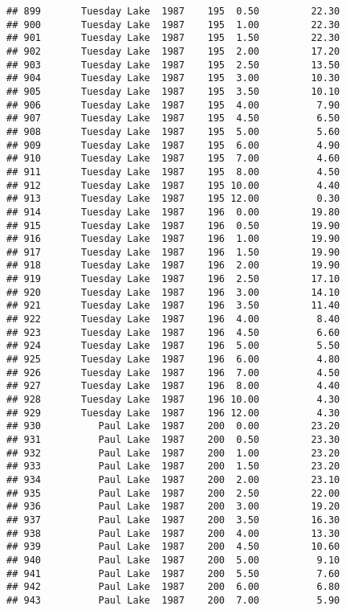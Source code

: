 \documentclass[
]{article}
\begin{document}
\begin{verbatim}
## 899       Tuesday Lake  1987    195  0.50         22.30
## 900       Tuesday Lake  1987    195  1.00         22.30
## 901       Tuesday Lake  1987    195  1.50         22.30
## 902       Tuesday Lake  1987    195  2.00         17.20
## 903       Tuesday Lake  1987    195  2.50         13.50
## 904       Tuesday Lake  1987    195  3.00         10.30
## 905       Tuesday Lake  1987    195  3.50         10.10
## 906       Tuesday Lake  1987    195  4.00          7.90
## 907       Tuesday Lake  1987    195  4.50          6.50
## 908       Tuesday Lake  1987    195  5.00          5.60
## 909       Tuesday Lake  1987    195  6.00          4.90
## 910       Tuesday Lake  1987    195  7.00          4.60
## 911       Tuesday Lake  1987    195  8.00          4.50
## 912       Tuesday Lake  1987    195 10.00          4.40
## 913       Tuesday Lake  1987    195 12.00          0.30
## 914       Tuesday Lake  1987    196  0.00         19.80
## 915       Tuesday Lake  1987    196  0.50         19.90
## 916       Tuesday Lake  1987    196  1.00         19.90
## 917       Tuesday Lake  1987    196  1.50         19.90
## 918       Tuesday Lake  1987    196  2.00         19.90
## 919       Tuesday Lake  1987    196  2.50         17.10
## 920       Tuesday Lake  1987    196  3.00         14.10
## 921       Tuesday Lake  1987    196  3.50         11.40
## 922       Tuesday Lake  1987    196  4.00          8.40
## 923       Tuesday Lake  1987    196  4.50          6.60
## 924       Tuesday Lake  1987    196  5.00          5.50
## 925       Tuesday Lake  1987    196  6.00          4.80
## 926       Tuesday Lake  1987    196  7.00          4.50
## 927       Tuesday Lake  1987    196  8.00          4.40
## 928       Tuesday Lake  1987    196 10.00          4.30
## 929       Tuesday Lake  1987    196 12.00          4.30
## 930          Paul Lake  1987    200  0.00         23.20
## 931          Paul Lake  1987    200  0.50         23.30
## 932          Paul Lake  1987    200  1.00         23.20
## 933          Paul Lake  1987    200  1.50         23.20
## 934          Paul Lake  1987    200  2.00         23.10
## 935          Paul Lake  1987    200  2.50         22.00
## 936          Paul Lake  1987    200  3.00         19.20
## 937          Paul Lake  1987    200  3.50         16.30
## 938          Paul Lake  1987    200  4.00         13.30
## 939          Paul Lake  1987    200  4.50         10.60
## 940          Paul Lake  1987    200  5.00          9.10
## 941          Paul Lake  1987    200  5.50          7.60
## 942          Paul Lake  1987    200  6.00          6.80
## 943          Paul Lake  1987    200  7.00          5.90

\end{verbatim}
\end{document}
